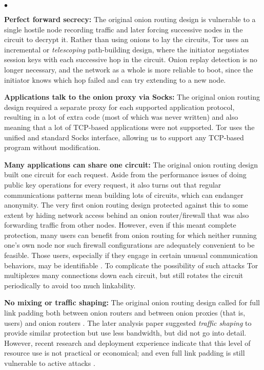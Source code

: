\documentclass[times,10pt,twocolumn]{article}
\newenvironment{tightlist}{\begin{list}{$\bullet$}{
  \setlength{\itemsep}{0mm}
    \setlength{\parsep}{0mm}
    }}{\end{list}}
\begin{document}
\begin{tightlist}

\item \textbf{Perfect forward secrecy:} The original onion routing
design is vulnerable to a single hostile node recording traffic and later
forcing successive nodes in the circuit to decrypt it. Rather than using
onions to lay the circuits, Tor uses an incremental or \emph{telescoping}
path-building design, where the initiator negotiates session keys with
each successive hop in the circuit. Onion replay detection is no longer
necessary, and the network as a whole is more reliable to boot, since
the initiator knows which hop failed and can try extending to a new node.

\item \textbf{Applications talk to the onion proxy via Socks:}
The original onion routing design required a separate proxy for each
supported application protocol, resulting in a lot of extra code (most
of which was never written) and also meaning that a lot of TCP-based
applications were not supported. Tor uses the unified and standard Socks
\cite{socks4,socks5} interface, allowing us to support any TCP-based
program without modification.

\item \textbf{Many applications can share one circuit:} The original
onion routing design built one circuit for each request. Aside from the
performance issues of doing public key operations for every request, it
also turns out that regular communications patterns mean building lots
of circuits, which can endanger anonymity.
The very first onion routing design \cite{or-ih96} protected against
this to some extent by hiding network access behind an onion
router/firewall that was also forwarding traffic from other nodes.
However, even if this meant complete protection, many users can
benefit from onion routing for which neither running one's own node
nor such firewall configurations are adequately convenient to be
feasible. Those users, especially if they engage in certain unusual
communication behaviors, may be identifiable \cite{wright03}. To
complicate the possibility of such attacks Tor multiplexes many
connections down each circuit, but still rotates the circuit
periodically to avoid too much linkability.

\item \textbf{No mixing or traffic shaping:} The original onion routing
design called for full link padding both between onion routers and between
onion proxies (that is, users) and onion routers \cite{or-jsac98}. The
later analysis paper \cite{or-pet00} suggested \emph{traffic shaping}
to provide similar protection but use less bandwidth, but did not go
into detail. However, recent research \cite{econymics} and deployment
experience \cite{freedom} indicate that this level of resource
use is not practical or economical; and even full link padding is still
vulnerable to active attacks \cite{defensive-dropping}.


\end{tightlist}
\end{document}
